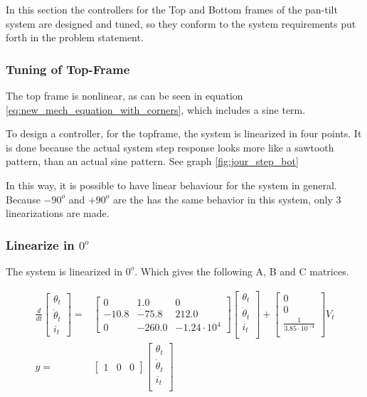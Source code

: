 \documentclass[../../../Main]{subfiles}
\begin{document}
In this section the controllers for the Top and Bottom frames of the pan-tilt system are designed and tuned, so they conform to the system requirements put forth in the problem statement.

\subsubsection{Tuning of Top-Frame}
\label{sec:top_frame_tuning}
The top frame is nonlinear, as can be seen in equation \eqref{eq:new_mech_equation_with_corners}, which includes a sine term.

To design a controller, for the topframe, the system is linearized in four points. It is done because the actual system step response looks more like a sawtooth pattern, than an actual sine pattern. See graph \ref{fig:jour_step_bot}

In this way, it is possible to have linear behaviour for the system in general.
Because $-90^o$ and  $+90^o$ are the has the same behavior in this system, only 3 linearizations are made.

\subsubsection{Linearize in $0^o$}
\label{sec:linearize}
The system is linearized in $0^o$. Which gives the following A, B and C matrices. 


\begin{equation}
      \begin{split}
      \label{eq:zero_linearized}
      \frac{d}{dt}
    \begin{bmatrix}
        \theta_t \\
        \dot \theta_t \\
        i_t
    \end{bmatrix}
    =&
    \begin{bmatrix}0 & 1.0 & 0\\ -10.8 & -75.8 & 212.0\\ 0 & -260.0 & -1.24\cdot10^{4}\end{bmatrix}
    \begin{bmatrix}
        \theta_t \\
        \dot \theta_t \\
        i_t \\
    \end{bmatrix}
    +
    \begin{bmatrix}
        0 \\
        0 \\
	\frac{1}{3.85\cdot10^{-4}}\\
    \end{bmatrix}
    V_t
\\
      y =&
    \begin{bmatrix}
        1 & 0 & 0
    \end{bmatrix}
    \begin{bmatrix}
        \theta_t \\
        \dot \theta_t\\
        i_t\\
    \end{bmatrix}
    \end{split}
\end{equation}
\end{document}

